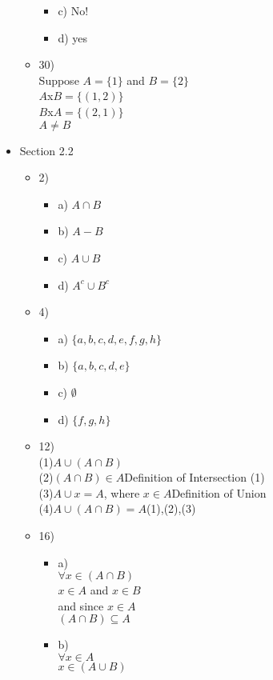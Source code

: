 \documentclass{article}
\begin{document}
\begin{itemize}
\begin{itemize}
\begin{itemize}
    \item
    c) No!
    \item
    d) yes
    \end{itemize}
    \item
    30)\\
    Suppose $A=\{1\}$ and $B=\{2\}$\\
    $A$x$B=\{(1,2)\}$\\
    $B$x$A=\{(2,1)\}$\\
    $A\ne B$
  \end{itemize}
  \item
  Section 2.2
  \begin{itemize}
  \item
  2) \begin{itemize}
  \item
  a)
  $A\cap B$
  \item
  b)
  $A-B$
  \item
  c)
  $A\cup B$
  \item
  d)
  $A^{c}\cup B^{c}$
  \end{itemize}
  \item
  4)\begin{itemize}
    \item
    a) $\{a,b,c,d,e,f,g,h\}$
    \item
    b) $\{a,b,c,d,e\}$
    \item
    c) $\emptyset$
    \item
    d) $\{f,g,h\}$
  \end{itemize}
  \item
  12)\\
  (1)$A\cup (A\cap B)$\\
  (2)$(A\cap B)\in A$\hfill Definition of Intersection (1)\\
  (3)$A\cup x=A$, where $x\in A$\hfill Definition of Union\\
  (4)$A\cup (A\cap B) = A$\hfill (1),(2),(3)
  \item
  16)\begin{itemize}
    \item
      a)\\
      $\forall x\in (A\cap B)$\\
      $x\in A$ and $x\in B$\\
      and since $x\in A$\\
      $(A\cap B)\subseteq A$
    \item
      b)\\
      $\forall x\in A$\\
      $x\in (A\cup B)$\\

\end{itemize}
\end{itemize}
\end{itemize}
\end{document}
